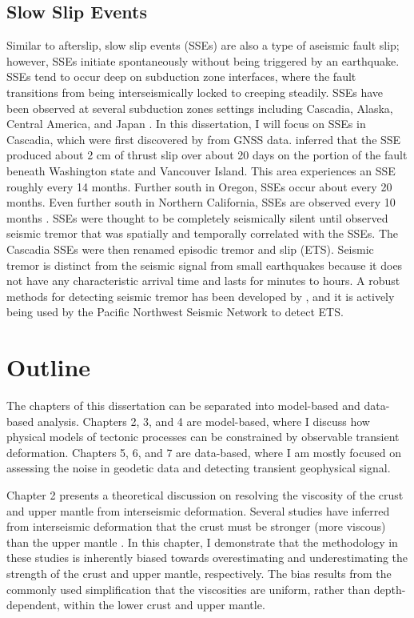 \subsection{Slow Slip Events} 
Similar to afterslip, slow slip events (SSEs) are also a type of
aseismic fault slip; however, SSEs initiate spontaneously without being
triggered by an earthquake. SSEs tend to occur deep on subduction zone
interfaces, where the fault transitions from being interseismically
locked to creeping steadily. SSEs have been observed at several
subduction zones settings including Cascadia, Alaska, Central America,
and Japan \citep{Schwartz2007}. In this dissertation, I will focus on
SSEs in Cascadia, which were first discovered by \citet{Dragert2001}
from GNSS data. \citet{Dragert2001} inferred that the SSE produced
about 2 cm of thrust slip over about 20 days on the portion of the
fault beneath Washington state and Vancouver Island. This area
experiences an SSE roughly every 14 months. Further south in Oregon,
SSEs occur about every 20 months. Even further south in Northern
California, SSEs are observed every 10 months \citep{Brudzinski2007}.
SSEs were thought to be completely seismically silent until
\citet{Rogers2003} observed seismic tremor that was spatially and
temporally correlated with the SSEs. The Cascadia SSEs were then
renamed episodic tremor and slip (ETS). Seismic tremor is distinct
from the seismic signal from small earthquakes because it does not
have any characteristic arrival time and lasts for minutes to hours. A
robust methods for detecting seismic tremor has been developed by
\citet{Wech2010}, and it is actively being used by the Pacific
Northwest Seismic Network to detect ETS.

\section{Outline}
The chapters of this dissertation can be separated into model-based
and data-based analysis. Chapters 2, 3, and 4 are model-based, where I
discuss how physical models of tectonic processes can be constrained
by observable transient deformation. Chapters 5, 6, and 7 are
data-based, where I am mostly focused on assessing the noise in
geodetic data and detecting transient geophysical signal.

Chapter 2 presents a theoretical discussion on resolving the viscosity
of the crust and upper mantle from interseismic deformation. Several
studies have inferred from interseismic deformation that the crust
must be stronger (more viscous) than the upper mantle
\citep{Thatcher2008}. In this chapter, I demonstrate that the
methodology in these studies is inherently biased towards
overestimating and underestimating the strength of the crust and upper
mantle, respectively. The bias results from the commonly used
simplification that the viscosities are uniform, rather than
depth-dependent, within the lower crust and upper mantle.

